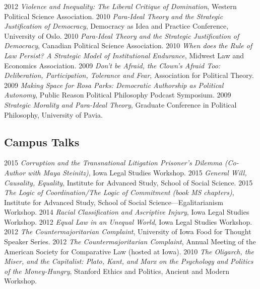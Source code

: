 \documentclass[letterpaper]{moderncv}
\begin{document}
{2012}
{\textit{Violence and Inequality: The Liberal Critique of Domination}, Western Political Science Association.}
\vspace{1mm}
\cvitem
{2010}
{\textit{Para-Ideal Theory and the Strategic Justification of Democracy}, Democracy as Idea and Practice Conference, University of Oslo.}
\vspace{1mm}
\cvitem
{2010}
{\textit{Para-Ideal Theory and the Strategic Justification of Democracy}, Canadian Political Science Association.}
\vspace{1mm}
\cvitem
{2010}
{\textit{When does the Rule of Law Persist? A Strategic Model of Institutional Endurance}, Midwest Law and Economics Association.}
\vspace{1mm}
\cvitem
{2009}
{\textit{Don't be Afraid, the Clown's Afraid Too: Deliberation, Participation, Tolerance and Fear}, Association for Political Theory.}
\vspace{1mm}
\cvitem
{2009}
{\textit{Making Space for Rosa Parks: Democratic Authorship as Political Autonomy}, Public Reason Political Philosophy Podcast Symposium.}
\vspace{1mm}
\cvitem
{2009}
{\textit{Strategic Morality and Para-Ideal Theory}, Graduate Conference in Political Philosophy, University of Pavia.}
\vspace{1mm}
\subsection{Campus Talks}
\cvitem
{2015}
{\textit{Corruption and the Transnational Litigation Prisoner's Dilemma (Co-Author with Maya Steinitz)}, Iowa Legal Studies Workshop.}
\vspace{1mm}
\cvitem
{2015}
{\textit{General Will, Causality, Equality}, Institute for Advanced Study, School of Social Science.}
\vspace{1mm}
\cvitem
{2015}
{\textit{The Logic of Coordination/The Logic of Commitment (book MS chapters)}, Institute for Advanced Study, School of Social Science---Egalitarianism Workshop.}
\vspace{1mm}
\cvitem
{2014}
{\textit{Racial Classification and Ascriptive Injury}, Iowa Legal Studies Workshop.}
\vspace{1mm}
\cvitem
{2012}
{\textit{Equal Law in an Unequal World}, Iowa Legal Studies Workshop.}
\vspace{1mm}
\cvitem
{2012}
{\textit{The Countermajoritarian Complaint}, University of Iowa Food for Thought Speaker Series.}
\vspace{1mm}
\cvitem
{2012}
{\textit{The Countermajoritarian Complaint}, Annual Meeting of the American Society for Comparative Law (hosted at Iowa).}
\vspace{1mm}
\cvitem
{2010}
{\textit{The Oligarch, the Miser, and the Capitalist: Plato, Kant, and Marx on the Psychology and Politics of the Money-Hungry}, Stanford Ethics and Politics, Ancient and Modern Workshop.}
\vspace{1mm}
\end{document}
